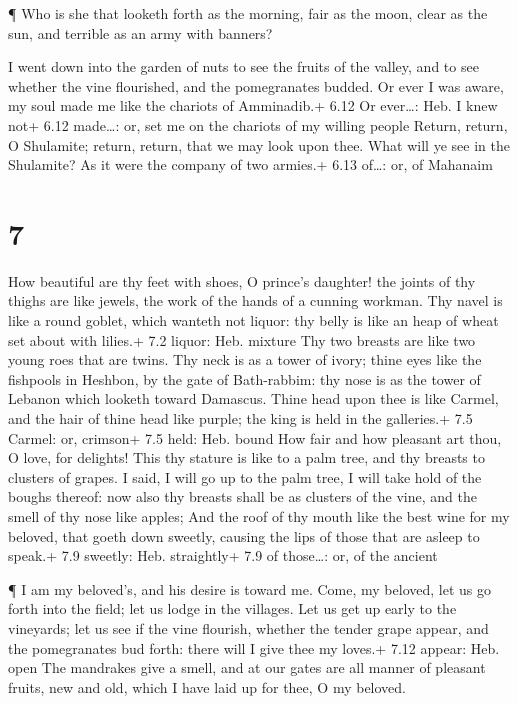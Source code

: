  ¶ Who is she that looketh forth as the morning, fair as
the moon, clear as the sun, and terrible as an army with banners?

 I went down into the garden of nuts to see the fruits of
the valley, and to see whether the vine flourished, and the pomegranates
budded.  Or ever I was aware, my soul made me like the
chariots of Amminadib.+ 6.12 Or ever\ldots: Heb. I knew not+ 6.12
made\ldots: or, set me on the chariots of my willing people
 Return, return, O Shulamite; return, return, that we may
look upon thee. What will ye see in the Shulamite? As it were the
company of two armies.+ 6.13 of\ldots: or, of Mahanaim

\hypertarget{section-6}{%
\section{7}\label{section-6}}

 How beautiful are thy feet with shoes, O prince's daughter!
the joints of thy thighs are like jewels, the work of the hands of a
cunning workman.  Thy navel is like a round goblet, which
wanteth not liquor: thy belly is like an heap of wheat set about with
lilies.+ 7.2 liquor: Heb. mixture  Thy two breasts are like
two young roes that are twins.  Thy neck is as a tower of
ivory; thine eyes like the fishpools in Heshbon, by the gate of
Bath-rabbim: thy nose is as the tower of Lebanon which looketh toward
Damascus.  Thine head upon thee is like Carmel, and the hair
of thine head like purple; the king is held in the galleries.+ 7.5
Carmel: or, crimson+ 7.5 held: Heb. bound  How fair and how
pleasant art thou, O love, for delights!  This thy stature
is like to a palm tree, and thy breasts to clusters of grapes.
 I said, I will go up to the palm tree, I will take hold of
the boughs thereof: now also thy breasts shall be as clusters of the
vine, and the smell of thy nose like apples;  And the roof
of thy mouth like the best wine for my beloved, that goeth down sweetly,
causing the lips of those that are asleep to speak.+ 7.9 sweetly: Heb.
straightly+ 7.9 of those\ldots: or, of the ancient

 ¶ I am my beloved's, and his desire is toward me.
 Come, my beloved, let us go forth into the field; let us
lodge in the villages.  Let us get up early to the
vineyards; let us see if the vine flourish, whether the tender grape
appear, and the pomegranates bud forth: there will I give thee my
loves.+ 7.12 appear: Heb. open  The mandrakes give a smell,
and at our gates are all manner of pleasant fruits, new and old, which I
have laid up for thee, O my beloved.

